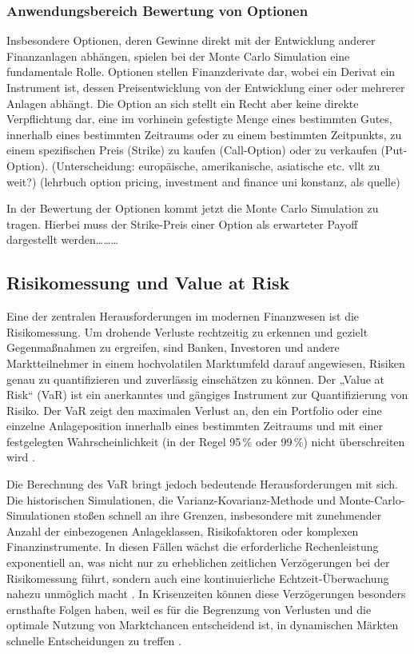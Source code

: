 \subsubsection*{Anwendungsbereich Bewertung von Optionen}
Insbesondere Optionen, deren Gewinne direkt mit der Entwicklung anderer Finanzanlagen abhängen, spielen bei der Monte Carlo Simulation eine fundamentale Rolle. 
Optionen stellen Finanzderivate dar, wobei ein Derivat ein Instrument ist, dessen Preisentwicklung von der Entwicklung einer oder mehrerer Anlagen abhängt. Die Option an sich stellt ein Recht aber keine direkte Verpflichtung dar, eine im vorhinein gefestigte Menge eines bestimmten Gutes, innerhalb eines bestimmten Zeitraums oder zu einem bestimmten Zeitpunkts, zu einem spezifischen Preis (Strike) zu kaufen (Call-Option) oder zu verkaufen (Put-Option). 
(Unterscheidung: europäische, amerikanische, asiatische etc. vllt zu weit?)
(lehrbuch option pricing, investment and finance uni konstanz, als quelle)
 
In der Bewertung der Optionen kommt jetzt die Monte Carlo Simulation zu tragen. Hierbei muss der Strike-Preis einer Option als erwarteter Payoff dargestellt werden………


\subsection{Risikomessung und Value at Risk}
Eine der zentralen Herausforderungen im modernen Finanzwesen ist die Risikomessung. Um drohende Verluste rechtzeitig zu erkennen und gezielt Gegenmaßnahmen zu ergreifen, sind Banken, Investoren und andere Marktteilnehmer in einem hochvolatilen Marktumfeld darauf angewiesen, Risiken genau zu quantifizieren und zuverlässig einschätzen zu können. Der „Value at Risk“ (VaR) ist ein anerkanntes und gängiges Instrument zur Quantifizierung von Risiko. Der VaR zeigt den maximalen Verlust an, den ein Portfolio oder eine einzelne Anlageposition innerhalb eines bestimmten Zeitraums und mit einer festgelegten Wahrscheinlichkeit (in der Regel 95\,\% oder 99\,\%) nicht überschreiten wird \cite{springer2025,plos2024}.

Die Berechnung des VaR bringt jedoch bedeutende Herausforderungen mit sich. Die historischen Simulationen, die Varianz-Kovarianz-Methode und Monte-Carlo-Simulationen stoßen schnell an ihre Grenzen, insbesondere mit zunehmender Anzahl der einbezogenen Anlageklassen, Risikofaktoren oder komplexen Finanzinstrumente. In diesen Fällen wächst die erforderliche Rechenleistung exponentiell an, was nicht nur zu erheblichen zeitlichen Verzögerungen bei der Risikomessung führt, sondern auch eine kontinuierliche Echtzeit-Überwachung nahezu unmöglich macht \cite{plos2024,bouland2020}. In Krisenzeiten können diese Verzögerungen besonders ernsthafte Folgen haben, weil es für die Begrenzung von Verlusten und die optimale Nutzung von Marktchancen entscheidend ist, in dynamischen Märkten schnelle Entscheidungen zu treffen \cite{orus2018}.

